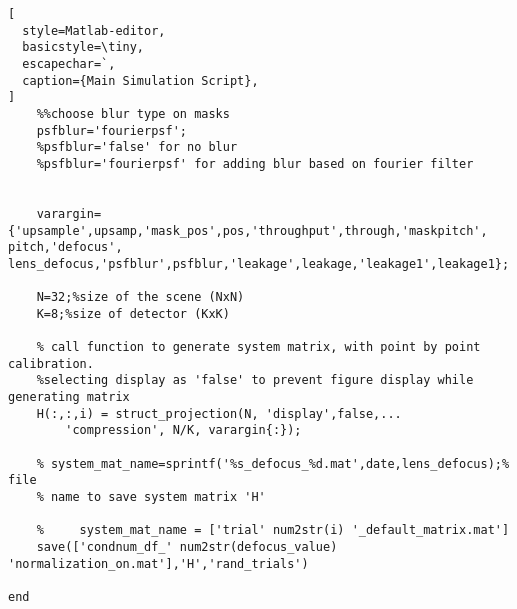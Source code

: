 \begin{lstlisting}[
  style=Matlab-editor,
  basicstyle=\tiny,
  escapechar=`,
  caption={Main Simulation Script},
]
    %%choose blur type on masks
    psfblur='fourierpsf';
    %psfblur='false' for no blur
    %psfblur='fourierpsf' for adding blur based on fourier filter
    
    
    varargin={'upsample',upsamp,'mask_pos',pos,'throughput',through,'maskpitch', pitch,'defocus', lens_defocus,'psfblur',psfblur,'leakage',leakage,'leakage1',leakage1};
    
    N=32;%size of the scene (NxN)
    K=8;%size of detector (KxK)
    
    % call function to generate system matrix, with point by point calibration.
    %selecting display as 'false' to prevent figure display while generating matrix
    H(:,:,i) = struct_projection(N, 'display',false,...
        'compression', N/K, varargin{:});
    
    % system_mat_name=sprintf('%s_defocus_%d.mat',date,lens_defocus);% file
    % name to save system matrix 'H'
    
    %     system_mat_name = ['trial' num2str(i) '_default_matrix.mat']
    save(['condnum_df_' num2str(defocus_value) 'normalization_on.mat'],'H','rand_trials')
    
end

\end{lstlisting}


